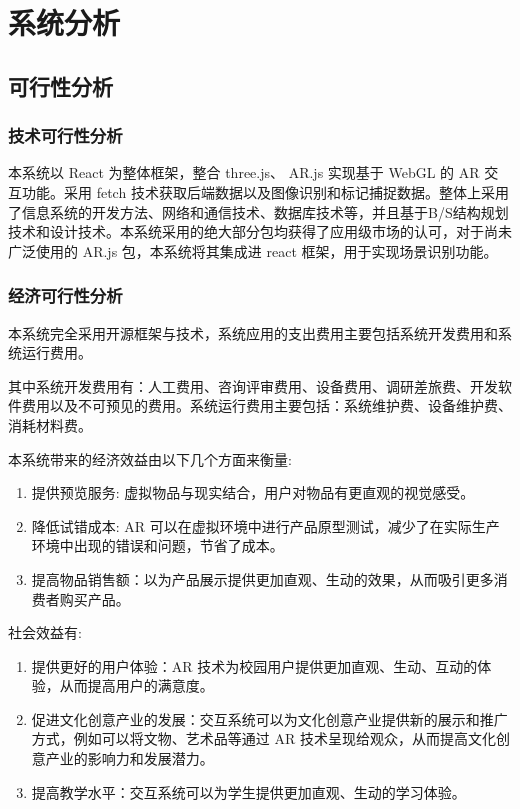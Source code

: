 \section{系统分析}
\subsection{可行性分析}
\subsubsection{技术可行性分析}

本系统以 React 为整体框架，整合 three.js、 AR.js 实现基于 WebGL 的 AR 交互功能。采用 fetch 技术获取后端数据以及图像识别和标记捕捉数据。整体上采用了信息系统的开发方法、网络和通信技术、数据库技术等，并且基于B/S结构规划技术和设计技术。本系统采用的绝大部分包均获得了应用级市场的认可，对于尚未广泛使用的 AR.js 包，本系统将其集成进 react 框架，用于实现场景识别功能。

\subsubsection{经济可行性分析}

本系统完全采用开源框架与技术，系统应用的支出费用主要包括系统开发费用和系统运行费用。

其中系统开发费用有：人工费用、咨询评审费用、设备费用、调研差旅费、开发软件费用以及不可预见的费用。系统运行费用主要包括：系统维护费、设备维护费、消耗材料费。

本系统带来的经济效益由以下几个方面来衡量:
\begin{enumerate}
  \item 提供预览服务: 虚拟物品与现实结合，用户对物品有更直观的视觉感受。
  \item 降低试错成本: AR 可以在虚拟环境中进行产品原型测试，减少了在实际生产环境中出现的错误和问题，节省了成本。
  \item 提高物品销售额：以为产品展示提供更加直观、生动的效果，从而吸引更多消费者购买产品。
\end{enumerate}

社会效益有:
\begin{enumerate}
  \item 提供更好的用户体验：AR 技术为校园用户提供更加直观、生动、互动的体验，从而提高用户的满意度。
  \item 促进文化创意产业的发展：交互系统可以为文化创意产业提供新的展示和推广方式，例如可以将文物、艺术品等通过 AR 技术呈现给观众，从而提高文化创意产业的影响力和发展潜力。
  \item 提高教学水平：交互系统可以为学生提供更加直观、生动的学习体验。
\end{enumerate}

